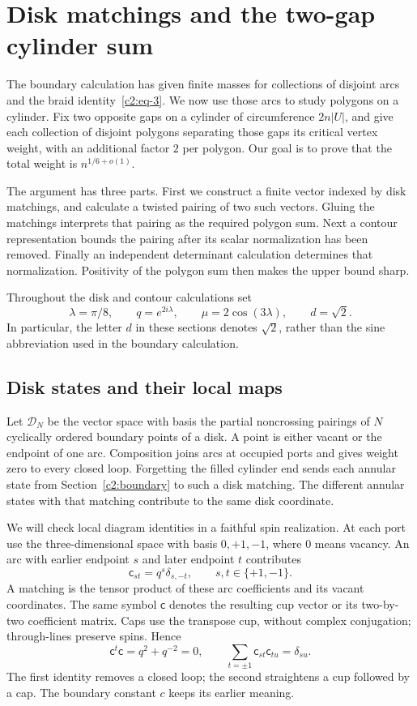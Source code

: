 \section{Disk matchings and the two-gap cylinder sum}
\label{c2:sec-disk-gluing}

The boundary calculation has given finite masses for collections of disjoint
arcs and the braid identity~\eqref{c2:eq-3}. We now use those arcs to study
polygons on a cylinder. Fix two opposite gaps on a cylinder of circumference
\(2n|U|\), and give each collection of disjoint polygons separating those gaps
its critical vertex weight, with an additional factor \(2\) per polygon.
Our goal is to prove that the total weight is \(n^{1/6+o(1)}\).

The argument has three parts. First we construct a finite vector indexed by
disk matchings, and calculate a twisted pairing of two such vectors. Gluing
the matchings interprets that pairing as the required polygon sum. Next a
contour representation bounds the pairing after its scalar normalization
has been removed. Finally an independent determinant calculation determines
that normalization. Positivity of the polygon sum then makes the upper
bound sharp.

Throughout the disk and contour calculations set
\[
 \lambda=\pi/8,\qquad q=e^{2i\lambda},\qquad
 \mu=2\cos(3\lambda),\qquad d=\sqrt2.
\]
In particular, the letter \(d\) in these sections denotes \(\sqrt2\), rather
than the sine abbreviation used in the boundary calculation.

\subsection{Disk states and their local maps}
\label{c2:sec-disk-states}

Let \(\mathcal D_N\) be the vector space with basis the partial
noncrossing pairings of \(N\) cyclically ordered boundary points of a disk.
A point is either vacant or the endpoint of one arc. Composition joins
arcs at occupied ports and gives weight zero to every closed loop.
Forgetting the filled cylinder end sends each annular state from
Section~\ref{c2:boundary} to such a disk matching. The different annular
states with that matching contribute to the same disk coordinate.

We will check local diagram identities in a faithful spin realization.
At each port use the three-dimensional space with basis \(0,+1,-1\),
where \(0\) means vacancy. An arc with earlier endpoint \(s\) and later
endpoint \(t\) contributes
\[
 \mathsf c_{st}=q^s\delta_{s,-t},\qquad s,t\in\{+1,-1\}.
\]
A matching is the tensor product of these arc coefficients and its vacant
coordinates. The same symbol \(\mathsf c\) denotes the resulting cup
vector or its two-by-two coefficient matrix. Caps use the transpose cup,
without complex conjugation; through-lines preserve spins. Hence
\[
 \mathsf c^t\mathsf c=q^2+q^{-2}=0,
 \qquad \sum_{t=\pm1}\mathsf c_{st}\mathsf c_{tu}=\delta_{su}.
\]
The first identity removes a closed loop; the second straightens a cup
followed by a cap. The boundary constant \(c\) keeps its earlier meaning.

